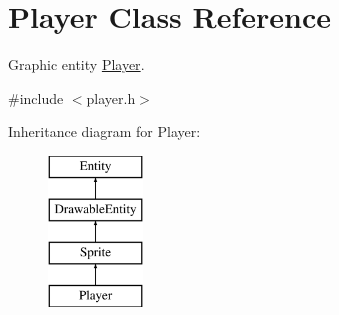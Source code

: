 \hypertarget{class_player}{}\section{Player Class Reference}
\label{class_player}


Graphic entity \hyperlink{class_player}{Player}.  




{\ttfamily \#include $<$player.\+h$>$}

Inheritance diagram for Player\+:\begin{figure}[H]
\begin{center}
\leavevmode
\includegraphics[height=4.000000cm]{class_player}
\end{center}
\end{figure}

